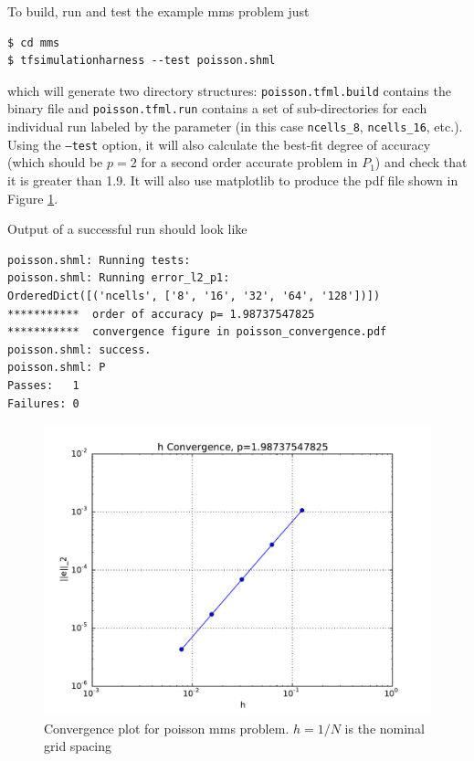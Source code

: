 To build, run and test the example mms problem just
\begin{lstlisting}[style=Bash]
$ cd mms
$ tfsimulationharness --test poisson.shml
\end{lstlisting} %
which will generate two directory structures:
\texttt{poisson.tfml.build} contains the binary file and
\texttt{poisson.tfml.run} contains a set of sub-directories for each
individual run labeled by the parameter (in this case
\texttt{ncells\_8}, \texttt{ncells\_16}, etc.).   Using the
\texttt{--test} option, it will also calculate the best-fit degree of
accuracy (which should be $p=2$ for a second order accurate problem in
$P_1$) and check that it is greater than 1.9.  It will also use
matplotlib to produce the pdf file shown in  Figure
\ref{fig:poisson_convergence}.

Output of a successful run should look like
\begin{lstlisting}[style=Bash]
poisson.shml: Running tests:
poisson.shml: Running error_l2_p1:
OrderedDict([('ncells', ['8', '16', '32', '64', '128'])])
***********  order of accuracy p= 1.98737547825
***********  convergence figure in poisson_convergence.pdf
poisson.shml: success.
poisson.shml: P
Passes:   1
Failures: 0
\end{lstlisting}

\begin{figure}[ht!]
  \centering
\includegraphics[width=.6\textwidth]{figures/poisson_convergence.pdf}
  \caption{Convergence plot for poisson mms problem. $h=1/N$ is the nominal grid spacing}
  \label{fig:poisson_convergence}
\end{figure}






